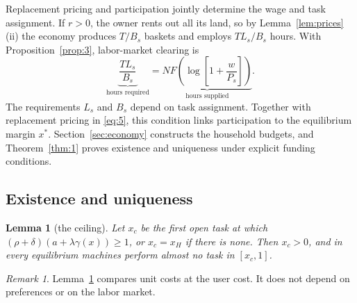 \documentclass[12pt]{article}
\theoremstyle{plain}
\newtheorem{lemma}{Lemma}
\theoremstyle{definition}
\theoremstyle{remark}
\newtheorem*{remark}{Remark}
\begin{document}
Replacement pricing and participation jointly determine the wage and task assignment.
If $r>0$, the owner rents out all its land, so by Lemma~\ref{lem:prices}(ii) the economy produces $T/B_s$ baskets and employs $TL_s/B_s$ hours. With Proposition~\ref{prop:3}, labor-market clearing is
\begin{equation}\label{eq:11}
\underbrace{\frac{TL_s}{B_s}}_{\text{hours required}}
=\underbrace{NF\left(\log\left[1+\frac{w}{P_s}\right]\right)}_{\text{hours supplied}}.
\end{equation}
The requirements $L_s$ and $B_s$ depend on task assignment. Together with replacement pricing in \eqref{eq:5}, this condition links participation to the equilibrium margin $x^*$. Section~\ref{sec:economy} constructs the household budgets, and Theorem~\ref{thm:1} proves existence and uniqueness under explicit funding conditions.

\subsection{Existence and uniqueness}\label{sec:existence}

\begin{lemma}[the ceiling]\label{lem:ceiling}
Let $x_c$ be the first open task at which $(\rho+\delta)(a+\lambda\gamma(x))\ge1$, or $x_c=x_H$ if there is none. Then $x_c>0$, and in every equilibrium machines perform almost no task in $[x_c,1]$.
\end{lemma}

\begin{remark}
Lemma~\ref{lem:ceiling} compares unit costs at the user cost. It does not depend on preferences or on the labor market.
\end{remark}
\end{document}

